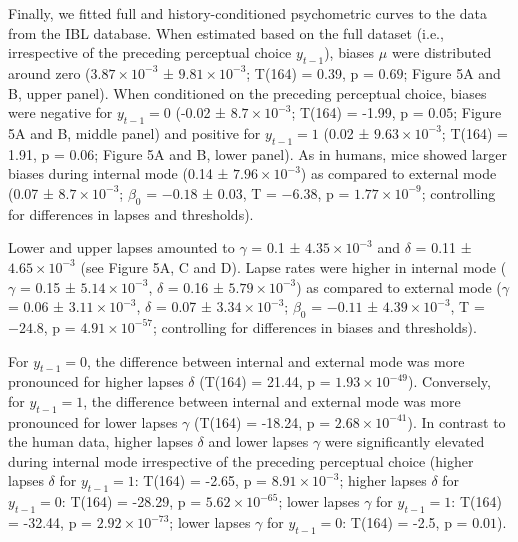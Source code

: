 \documentclass[
]{article}
\begin{document}
Finally, we fitted full and history-conditioned psychometric curves to
the data from the IBL database. When estimated based on the full dataset
(i.e., irrespective of the preceding perceptual choice \(y_{t-1}\)),
biases \(\mu\) were distributed around zero
(\ensuremath{3.87\times 10^{-3}} ± \ensuremath{9.81\times 10^{-3}};
T(164) = 0.39, p = \(0.69\); Figure 5A and B, upper panel). When
conditioned on the preceding perceptual choice, biases were negative for
\(y_{t-1} = 0\) (-0.02 ± \ensuremath{8.7\times 10^{-3}}; T(164) = -1.99,
p = \(0.05\); Figure 5A and B, middle panel) and positive for
\(y_{t-1} = 1\) (0.02 ± \ensuremath{9.63\times 10^{-3}}; T(164) = 1.91,
p = \(0.06\); Figure 5A and B, lower panel). As in humans, mice showed
larger biases during internal mode (0.14 ±
\ensuremath{7.96\times 10^{-3}}) as compared to external mode (0.07 ±
\ensuremath{8.7\times 10^{-3}}; \(\beta_0\) = \(-0.18\) ± \(0.03\), T =
\(-6.38\), p = \(\ensuremath{1.77\times 10^{-9}}\); controlling for
differences in lapses and thresholds).

Lower and upper lapses amounted to \(\gamma\) = 0.1 ±
\ensuremath{4.35\times 10^{-3}} and \(\delta\) = 0.11 ±
\ensuremath{4.65\times 10^{-3}} (see Figure 5A, C and D). Lapse rates
were higher in internal mode (\(\gamma\) = 0.15 ±
\ensuremath{5.14\times 10^{-3}}, \(\delta\) = 0.16 ±
\ensuremath{5.79\times 10^{-3}}) as compared to external mode
(\(\gamma\) = 0.06 ± \ensuremath{3.11\times 10^{-3}}, \(\delta\) = 0.07
± \ensuremath{3.34\times 10^{-3}}; \(\beta_0\) = \(-0.11\) ±
\(\ensuremath{4.39\times 10^{-3}}\), T = \(-24.8\), p =
\(\ensuremath{4.91\times 10^{-57}}\); controlling for differences in
biases and thresholds).

For \(y_{t-1} = 0\), the difference between internal and external mode
was more pronounced for higher lapses \(\delta\) (T(164) = 21.44, p =
\(\ensuremath{1.93\times 10^{-49}}\)). Conversely, for \(y_{t-1} = 1\),
the difference between internal and external mode was more pronounced
for lower lapses \(\gamma\) (T(164) = -18.24, p =
\(\ensuremath{2.68\times 10^{-41}}\)). In contrast to the human data,
higher lapses \(\delta\) and lower lapses \(\gamma\) were significantly
elevated during internal mode irrespective of the preceding perceptual
choice (higher lapses \(\delta\) for \(y_{t-1} = 1\): T(164) = -2.65, p
= \(\ensuremath{8.91\times 10^{-3}}\); higher lapses \(\delta\) for
\(y_{t-1} = 0\): T(164) = -28.29, p =
\(\ensuremath{5.62\times 10^{-65}}\); lower lapses \(\gamma\) for
\(y_{t-1} = 1\): T(164) = -32.44, p =
\(\ensuremath{2.92\times 10^{-73}}\); lower lapses \(\gamma\) for
\(y_{t-1} = 0\): T(164) = -2.5, p = \(0.01\)).
\end{document}
